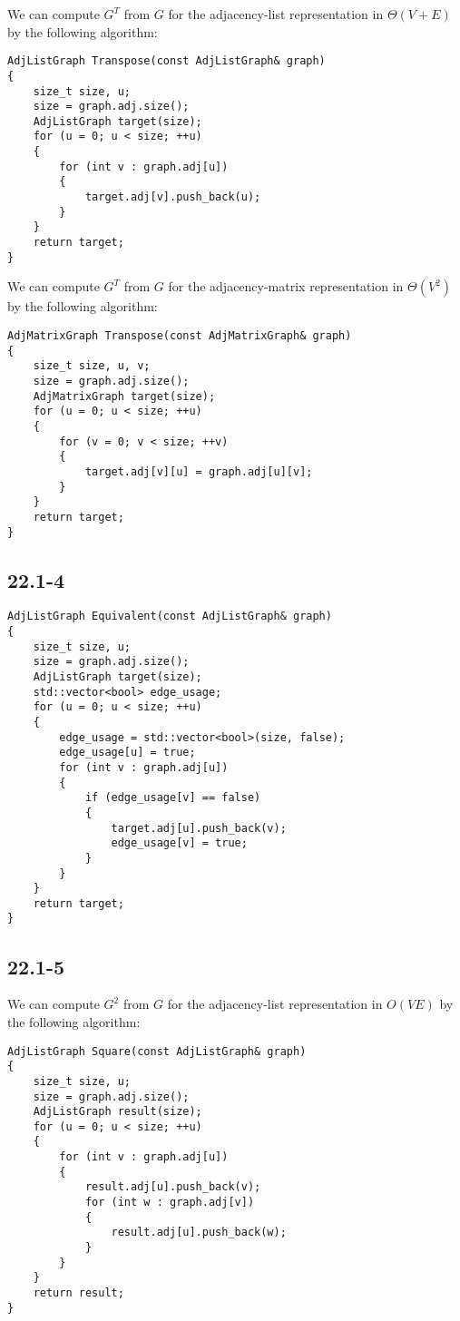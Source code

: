 We can compute $G^T$ from $G$ 
for the adjacency-list representation in $\Theta(V + E)$
by the following algorithm:

\begin{verbatim}
AdjListGraph Transpose(const AdjListGraph& graph)
{
    size_t size, u;
    size = graph.adj.size();
    AdjListGraph target(size);
    for (u = 0; u < size; ++u)
    {
        for (int v : graph.adj[u])
        {
            target.adj[v].push_back(u);
        }
    }
    return target;
}
\end{verbatim}

We can compute $G^T$ from $G$ 
for the adjacency-matrix representation in $\Theta(V^2)$
by the following algorithm:
    
\begin{verbatim}
AdjMatrixGraph Transpose(const AdjMatrixGraph& graph)
{
    size_t size, u, v;
    size = graph.adj.size();
    AdjMatrixGraph target(size);
    for (u = 0; u < size; ++u)
    {
        for (v = 0; v < size; ++v)
        {
            target.adj[v][u] = graph.adj[u][v];
        }
    }
    return target;
}
\end{verbatim}

\subsection*{22.1-4}

\begin{verbatim}
AdjListGraph Equivalent(const AdjListGraph& graph)
{
    size_t size, u;
    size = graph.adj.size();
    AdjListGraph target(size);
    std::vector<bool> edge_usage;
    for (u = 0; u < size; ++u)
    {
        edge_usage = std::vector<bool>(size, false);
        edge_usage[u] = true;
        for (int v : graph.adj[u])
        {
            if (edge_usage[v] == false)
            {
                target.adj[u].push_back(v);
                edge_usage[v] = true;
            }
        }
    }
    return target;
}
\end{verbatim}

\subsection*{22.1-5}

We can compute $G^2$ from $G$ 
for the adjacency-list representation in $O(VE)$
by the following algorithm:

\begin{verbatim}
AdjListGraph Square(const AdjListGraph& graph)
{
    size_t size, u;
    size = graph.adj.size();
    AdjListGraph result(size);
    for (u = 0; u < size; ++u)
    {
        for (int v : graph.adj[u])
        {
            result.adj[u].push_back(v);
            for (int w : graph.adj[v])
            {
                result.adj[u].push_back(w);
            }
        }
    }
    return result;
}
\end{verbatim}

